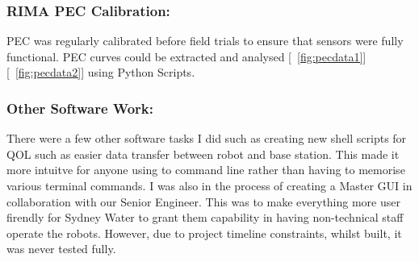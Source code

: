 \newpage
\subsubsection{RIMA PEC Calibration: }
PEC was regularly calibrated before field trials to ensure that sensors were fully functional. PEC curves could be extracted and analysed [~\ref{fig:pecdata1}] [~\ref{fig:pecdata2}] using Python Scripts. 


\newpage
\subsubsection{Other Software Work:}

There were a few other software tasks I did such as creating new shell scripts for QOL such as easier data transfer between robot and base station. This made it more intuitve for anyone using to command line rather than having to memorise
various terminal commands. I was also in the process of creating a Master GUI in collaboration with our Senior Engineer. This was to make everything more user firendly for Sydney Water to grant them capability in having non-technical
staff operate the robots. However, due to project timeline constraints, whilst built, it was never tested fully.
